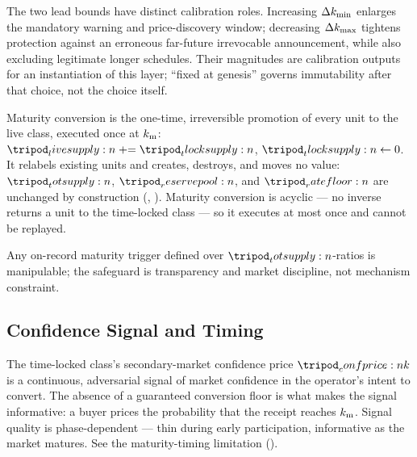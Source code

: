 \documentclass[../main.tex]{subfiles}
\begin{document}
The two lead bounds have distinct calibration roles. Increasing $\Delta k\sb{\min}$ enlarges the
mandatory warning and price-discovery window; decreasing $\Delta k\sb{\max}$ tightens protection
against an erroneous far-future irrevocable announcement, while also excluding legitimate
longer schedules. Their magnitudes are calibration outputs for an instantiation of this
layer; ``fixed at genesis'' governs immutability after that choice, not the choice itself.

\begin{definition}
    \label{def:maturity:conversion}
    Maturity conversion is the one-time, irreversible promotion of every \tlockclass{} unit
    to the live class, executed once at $k\sb{\mathrm{m}}$: $\livesupply{} \mathrel{+}=
    \tlocksupply{}$, $\tlocksupply{} \gets 0$. It relabels existing units and creates,
    destroys, and moves no value: $\totsupply{}$, $\reservepool{}$, and $\ratefloor{}$ are
    unchanged by construction (,
    ). Maturity conversion is acyclic --- no
    inverse returns a unit to the time-locked class --- so it executes at most once and
    cannot be replayed.
\end{definition}

\begin{remark}
    \label{rem:maturity:operator-discretion}
    Any on-record maturity trigger defined over $\totsupply{}$-ratios is manipulable; the
    safeguard is transparency and market discipline, not mechanism constraint.
\end{remark}

\subsection{Confidence Signal and Timing}
\label{sec:maturity:signal-timing}

\begin{remark}
    \label{rem:maturity:confidence-signal}
    The time-locked class's secondary-market confidence price $\confprice{k}$ is a
    continuous, adversarial signal of market confidence in the operator's intent to convert.
    The absence of a guaranteed conversion floor is what makes the signal informative: a
    buyer prices the probability that the receipt reaches $k\sb{\mathrm{m}}$. Signal quality is
    phase-dependent --- thin during early participation, informative as the market matures.
    See the maturity-timing limitation ().
\end{remark}
\end{document}

